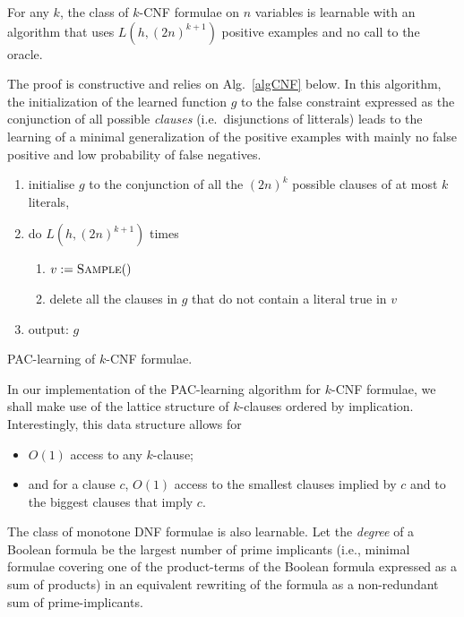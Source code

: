 \documentclass{llncs}
\begin{document}
\begin{theorem}\label{thm:kcnf}
For any $k$, the class of $k$-CNF formulae on $n$ variables is learnable with an
algorithm that uses $L(h,{(2 n)}^{k+1})$ positive examples and no call to the
oracle.
\end{theorem}

The proof is constructive and relies on Alg.~\ref{algCNF} below. In this algorithm, the initialization of the learned function $g$ to the false constraint expressed as the conjunction of all possible \emph{clauses} (i.e.~disjunctions of litterals)
leads to the learning of a minimal generalization of the positive examples with mainly no false positive and low probability of false negatives.

\begin{algorithm}
\begin{enumerate}
  \item initialise $g$ to the conjunction of all the $(2n)^k$ possible clauses of at most $k$ literals,
\item do $L(h,(2n)^{k+1})$ times 
\begin{enumerate}
\item $v:=\textsc{Sample}()$
\item delete all the clauses in $g$ that do not contain a literal true in $v$
\end{enumerate}
\item output: $g$
\end{enumerate}
\caption{PAC-learning of $k$-CNF formulae.\label{algCNF}}
\end{algorithm}

In our implementation of the PAC-learning algorithm for $k$-CNF formulae,
we shall make use of the lattice structure of $k$-clauses ordered by implication.
Interestingly, this data structure allows for
\begin{itemize}
	\item $O(1)$ access to any $k$-clause;
	\item and for a clause $c$, $O(1)$ access to the smallest clauses implied by $c$ and to the biggest clauses that imply $c$.
\end{itemize}

The class of monotone DNF formulae is also learnable. Let the \emph{degree} of
a Boolean formula be the largest number of prime implicants (i.e., minimal
formulae covering one of the product-terms of the Boolean formula expressed as
a sum of products) in an equivalent rewriting of the formula as a
non-redundant sum of prime-implicants.
\end{document}
